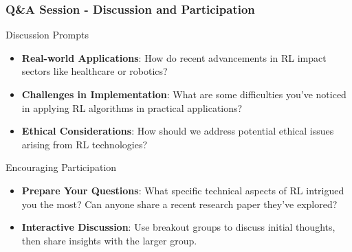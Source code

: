 \documentclass[aspectratio=169]{beamer}
\begin{document}
\begin{frame}[fragile]
  \frametitle{Q\&A Session - Discussion and Participation}
  \begin{block}{Discussion Prompts}
    \begin{itemize}
      \item \textbf{Real-world Applications}: How do recent advancements in RL impact sectors like healthcare or robotics?
      \item \textbf{Challenges in Implementation}: What are some difficulties you've noticed in applying RL algorithms in practical applications?
      \item \textbf{Ethical Considerations}: How should we address potential ethical issues arising from RL technologies?
    \end{itemize}
  \end{block}
  
  \begin{block}{Encouraging Participation}
    \begin{itemize}
      \item \textbf{Prepare Your Questions}: 
      What specific technical aspects of RL intrigued you the most? Can anyone share a recent research paper they've explored?
      
      \item \textbf{Interactive Discussion}: 
      Use breakout groups to discuss initial thoughts, then share insights with the larger group.
    \end{itemize}
  \end{block}
\end{frame}
\end{document}
